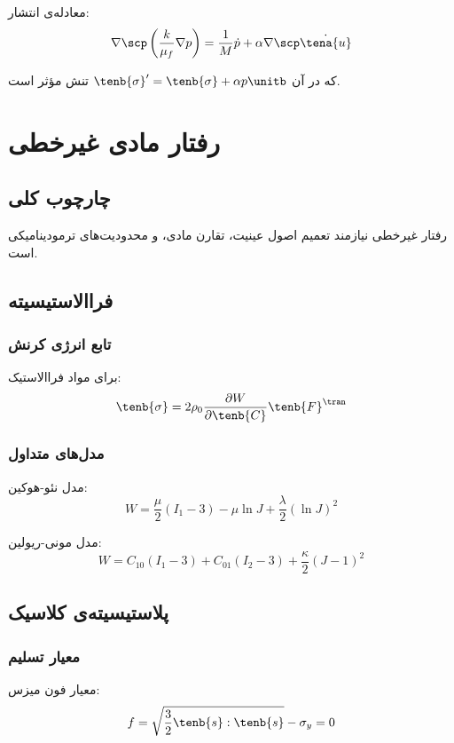 معادله‌ی انتشار:
\begin{equation}
	\nabla \scp \left( \frac{k}{\mu_f} \nabla p \right) = \frac{1}{M} \dot{p} + \alpha \nabla \scp \dot{\tena{u}}
\end{equation}

که در آن $\tenb{\sigma}' = \tenb{\sigma} + \alpha p \unitb$ تنش مؤثر است.

\section{رفتار مادی غیرخطی}

\subsection{چارچوب کلی}

رفتار غیرخطی نیازمند تعمیم اصول عینیت، تقارن مادی، و محدودیت‌های ترمودینامیکی است.

\subsection{فراالاستیسیته}

\subsubsection{تابع انرژی کرنش}
برای مواد فراالاستیک:
\begin{equation}
	\tenb{\sigma} = 2\rho_0 \frac{\partial W}{\partial \tenb{C}} \tenb{F}^\tran
\end{equation}

\subsubsection{مدل‌های متداول}
مدل نئو-هوکین:
\begin{equation}
	W = \frac{\mu}{2}(I_1 - 3) - \mu \ln J + \frac{\lambda}{2}(\ln J)^2
\end{equation}

مدل مونی-ریولین:
\begin{equation}
	W = C_{10}(I_1 - 3) + C_{01}(I_2 - 3) + \frac{\kappa}{2}(J - 1)^2
\end{equation}

\subsection{پلاستیسیته‌ی کلاسیک}

\subsubsection{معیار تسلیم}
معیار فون میزس:
\begin{equation}
	f = \sqrt{\frac{3}{2} \tenb{s} : \tenb{s}} - \sigma_y = 0
\end{equation}


